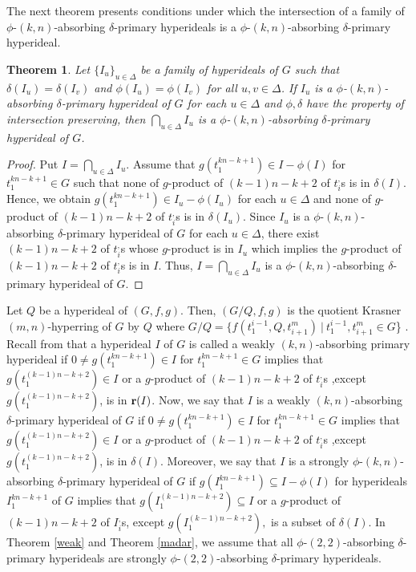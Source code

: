 \documentclass[preprint,review,10pt]{amsart}
\newtheorem{theorem}{Theorem}[section]
\theoremstyle{definition}
\theoremstyle{remark}
\numberwithin{equation}{section}
\begin{document}
The next theorem presents conditions under which the intersection of  a family of $\phi$-$(k,n)$-absorbing $\delta$-primary hyperideals is a $\phi$-$(k,n)$-absorbing $\delta$-primary hyperideal.
\begin{theorem} \label{kharazi}
Let $ \{I_u\}_{u \in \Delta}$ be a family of  hyperideals of $G$ such that $\delta(I_u)=\delta(I_v)$ and $\phi(I_u)=\phi(I_v)$ for all $u,v \in \Delta$. If $I_u$ is a $\phi$-$(k,n)$-absorbing $\delta$-primary hyperideal of $G$ for each $u \in \Delta$ and $\phi,\delta$ have the property of intersection
preserving, then $\bigcap_{u \in \Delta}I_u$ is a $\phi$-$(k,n)$-absorbing $\delta$-primary hyperideal of $G$.
\end{theorem}
\begin{proof}
Put $I=\bigcap_{u \in \Delta}I_u$. Assume that $g(t_1^{kn-k+1}) \in I-\phi(I)$ for $t_1^{kn-k+1} \in G$ such that none of $g$-product  of $(k-1)n-k+2$ of  $t_i^,$s is in $\delta(I)$. Hence, we obtain $g(t_1^{kn-k+1}) \in I_u-\phi(I_u)$ for each $u \in \Delta$ and none of $g$-product  of $(k-1)n-k+2$ of  $t_i^,$s is in $\delta(I_u)$. Since $I_u$ is a $\phi$-$(k,n)$-absorbing $\delta$-primary hyperideal of $G$ for each $u \in \Delta$, there exist $(k-1)n-k+2$ of  $t_i^,$s whose $g$-product is in $ I_u$  which implies the $g$-product of  $(k-1)n-k+2$ of   $t_i^,$s is in $I$. Thus, $I=\bigcap_{u \in \Delta}I_u$ is a $\phi$-$(k,n)$-absorbing $\delta$-primary hyperideal of $G$.
\end{proof}
Let $Q$ be a hyperideal of $(G,f,g)$. Then, $(G/Q,f,g)$ is the quotient Krasner $(m,n)$-hyperring of $G$ by $Q$ where $G/Q=\{f(t_1^{i-1},Q,t_{i+1}^m) \ \vert \ t_1^{i-1},t_{i+1}^m \in G$\} \cite{sorc1}.   Recall from \cite{weak} that a hyperideal $I$  of $G$ is called  a weakly $(k,n)$-absorbing primary hyperideal   if   $0 \neq g(t_1^{kn-k+1}) \in I$ for $t_1^{kn-k+1} \in G$ implies that  $g(t_1^{(k-1)n-k+2}) \in I$ or a $g$-product  of $(k-1)n-k+2$ of  $t_i^,$s ,except $g(t_1^{(k-1)n-k+2})$, is in ${\bf r}(I)$. Now, we say that $I$ is a weakly $(k,n)$-absorbing $\delta$-primary hyperideal of $G$ if   $0 \neq g(t_1^{kn-k+1}) \in I$ for $t_1^{kn-k+1} \in G$ implies that  $g(t_1^{(k-1)n-k+2}) \in I$ or a $g$-product  of $(k-1)n-k+2$ of  $t_i^,$s ,except $g(t_1^{(k-1)n-k+2})$, is in $\delta(I)$. Moreover, we say that $I$ is a strongly $\phi$-$(k,n)$-absorbing $\delta$-primary hyperideal of $G$ if $g(I_1^{kn-k+1}) \subseteq I-\phi(I)$ for  hyperideals $I_1^{kn-k+1}$ of $G$ implies that $g(I_1^{(k-1)n-k+2}) \subseteq I$ or a $g$-product of $(k-1)n-k+2$ of $I_i^,$s, except $g(I_1^{(k-1)n-k+2}),$ is a subset of $\delta(I)$. In Theorem \ref{weak} and Theorem \ref{madar}, we assume that all $\phi$-$(2,2)$-absorbing $\delta$-primary  hyperideals are strongly $\phi$-$(2,2)$-absorbing $\delta$-primary  hyperideals.
\end{document}
